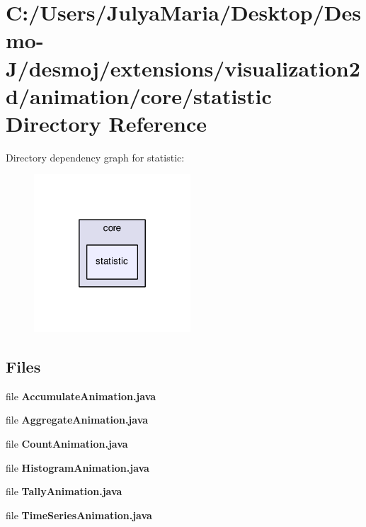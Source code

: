 \section{C\-:/\-Users/\-Julya\-Maria/\-Desktop/\-Desmo-\/\-J/desmoj/extensions/visualization2d/animation/core/statistic Directory Reference}
\label{dir_b77ffc1f2b8638b071e6d8db2b5fb042}
Directory dependency graph for statistic\-:
\nopagebreak
\begin{figure}[H]
\begin{center}
\leavevmode
\includegraphics[width=166pt]{dir_b77ffc1f2b8638b071e6d8db2b5fb042_dep}
\end{center}
\end{figure}
\subsection*{Files}
\begin{DoxyCompactItemize}
\item 
file {\bfseries Accumulate\-Animation.\-java}
\item 
file {\bfseries Aggregate\-Animation.\-java}
\item 
file {\bfseries Count\-Animation.\-java}
\item 
file {\bfseries Histogram\-Animation.\-java}
\item 
file {\bfseries Tally\-Animation.\-java}
\item 
file {\bfseries Time\-Series\-Animation.\-java}
\end{DoxyCompactItemize}

